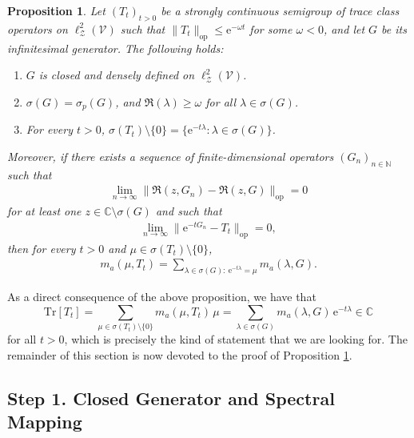 \documentclass{amsart}
\numberwithin{equation}{section}
\newtheorem{proposition}[theorem]{Proposition}
\theoremstyle{definition}
\newcommand\la{\lambda}
\newcommand\om{\omega}
\newcommand\si{\sigma}
\newcommand\mbb{\mathbb}
\newcommand\mf{\mathfrak}
\newcommand\mr{\mathrm}
\newcommand\ms{\mathscr}
\begin{document}
%

\begin{proposition}
\label{Proposition: Operator Theory}
Let $(T_t)_{t>0}$ be a strongly continuous semigroup of trace class operators on $\ell^2_\ms Z(\ms V)$
such that $\|T_t\|_{\mr{op}}\leq\mr e^{-\om t}$ for some $\om<0$, and
let $G$ be its infinitesimal generator.
The following holds:
\begin{enumerate}
\item $G$ is closed and densely defined on $\ell^2_\ms Z(\ms V)$.
\item $\si(G)=\si_p(G)$, and $\Re(\la)\geq\om$ for all $\la\in\si(G)$.
\item For every $t>0$, $\si(T_t)\setminus\{0\}=\{\mr e^{-t\la}:\la\in\si(G)\}$.
\end{enumerate}
Moreover, if there exists a sequence of finite-dimensional
operators $(G_n)_{n\in\mbb N}$ such that
\begin{align}
\label{Equation: Resolvent Convergence Assumption}
\lim_{n\to\infty}\|\mf R(z,G_n)-\mf R(z,G)\|_{\mr{op}}=0
\end{align}
for at least one $z\in\mbb C\setminus\si(G)$ and such that
\begin{align}
\label{Equation: Semigroup Convergence Assumption}
\lim_{n\to\infty}\|\mr e^{-t G_n}-T_t\|_{\mr{op}}=0,
\end{align}
then for every $t>0$ and $\mu\in\si(T_t)\setminus\{0\}$,
\begin{align}
\label{Equation: Multiplicity Identity}
m_a(\mu,T_t)=\sum_{\la\in\si(G):~\mr e^{-t\la}=\mu}m_a(\la,G).
\end{align}
\end{proposition}

%

As a direct consequence of the above proposition, we have that
\[\mr{Tr}[T_t]=\sum_{\mu\in\si(T_t)\setminus\{0\}}m_a(\mu,T_t)\,\mu=\sum_{\la\in\si(G)}m_a(\la,G)\,\mr e^{-t\la}\in\mbb C\]
for all $t>0$, which is precisely the kind of statement that we are looking for.
The remainder of this section is now devoted to the proof of Proposition \ref{Proposition: Operator Theory}.

%

\subsection{Step 1. Closed Generator and Spectral Mapping}

%
\end{document}
